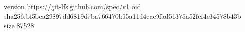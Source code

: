 version https://git-lfs.github.com/spec/v1
oid sha256:bf5bea29897dd6819d7ba766470b65a11d4cae9fad51375a52fef4e34578b43b
size 87528
